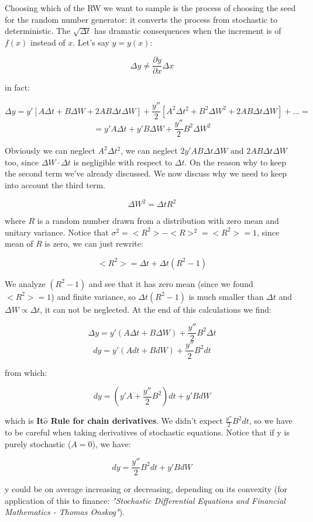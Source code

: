 \documentclass[a4paper, italian, openany]{book}
\begin{document}
Choosing which of the RW we want to sample is the process of choosing the seed for the random number generator: it converts the process from stochastic to deterministic. The $\sqrt{\Delta t}$ has dramatic consequences when the increment is of $f(x)$ instead of $x$. Let's say $y=y(x)$:

$$\Delta y \ne \frac{\partial y}{\partial x} \Delta x$$

in fact:

$$\Delta y = y' \left [ A \Delta t + B \Delta W + 2AB \Delta t \Delta W \right ] + \frac{y''}{2} \left [ A^2 \Delta t^2 + B^2 \Delta W^2 + 2AB\Delta t \Delta W \right ] + \ldots=$$
$$= y' A \Delta t + y' B \Delta W + \frac{y''}{2}B^2 \Delta W^2$$

Obviously we can neglect $A^2 \Delta t^2$, we can neglect  $2y'AB\Delta t \Delta W$ and $2AB\Delta t \Delta W$ too, since $\Delta W \cdot \Delta t$ is negligible with respect to $\Delta t$. On the reason why to keep the second term we've already discussed. We now discuss why we need to keep into account the third term.

$$\Delta W^2 = \Delta t R^2$$

where $R$ is a random number drawn from a distribution with zero mean and unitary variance. Notice that $\sigma^2 = <R^2> - <R>^2 = <R^2> = 1$, since mean of $R$ is zero, we can just rewrite:

$$<R^2> = \Delta t + \Delta t (R^2 -1)$$

We analyze $(R^2 -1)$ and see that it has zero mean (since we found $<R^2> = 1$) and finite variance,  so $\Delta t (R^2 -1)$ is much smaller than $\Delta t$ and $\Delta W \propto \Delta t$, it can not be neglected. At the end of this calculations we find:

$$\Delta y = y' \left ( A \Delta t + B \Delta W \right ) + \frac{y''}{2} B^2 \Delta t$$
$$d y = y' \left ( A dt + B dW \right ) + \frac{y''}{2} B^2 dt$$

from which:

$$d y = \left ( y'A + \frac{y''}{2} B^2 \right ) dt + y' B dW$$

which is \textbf{It$\hat{o}$ Rule for chain derivatives}. We didn't expect $\frac{y''}{2} B^2 dt$, so we have to be careful when taking derivatives of stochastic equations. Notice that if y is purely stochastic ($A=0$), we have:

$$dy = \frac{y''}{2} B^2 dt + y' BdW$$

y could be on average increasing or decreasing, depending on its convexity (for application of this to finance: \textit{"Stochastic Differential Equations and Financial Mathematics - Thomas Onskog"}).
\end{document}

